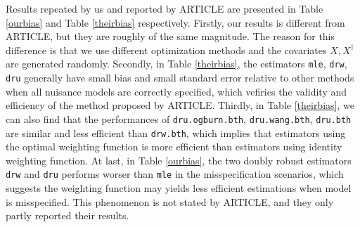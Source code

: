 \documentclass{article}
\begin{document}
Results repeated by us and reported by ARTICLE are presented in Table \ref*{ourbias} and Table \ref*{theirbias} respectively. Firstly, our results is different from ARTICLE, but they are roughly of the same magnitude. The reason for this difference is that we use different optimization methods and the covariates $X, X^\dagger$ are generated randomly. Secondly, in Table \ref*{theirbias}, the estimators \texttt{mle}, \texttt{drw}, \texttt{dru} generally have small bias and small standard error relative to other methods when all nuisance models are correctly specified, which vefiries the validity and efficiency of the method proposed by ARTICLE. Thirdly, in Table \ref*{theirbias}, we can also find that the performances of \texttt{dru.ogburn.bth}, \texttt{dru.wang.bth}, \texttt{dru.bth} are similar and less efficient than \texttt{drw.bth}, which implies that estimators using the optimal weighting function is more efficient than estimators using identity weighting function. At last, in Table \ref*{ourbias}, the two doubly robust estimators \texttt{drw} and \texttt{dru} performs worser than \texttt{mle} in the misspecification scenarios, which suggests the weighting function may yields less efficient estimations when model is misspecified. This phenomenon is not stated by ARTICLE, and they only partly reported their results.
\end{document}
